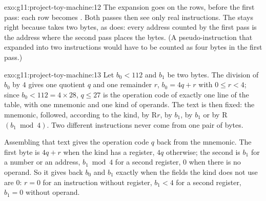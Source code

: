 \begin{solution}{exo:g11:project-toy-machine:12}
The expansion goes on the rows, before the first pass: each row  becomes . Both passes
then see only real instructions. The  stays right because  takes two bytes, as  does:
every address counted by the first pass is the address where the second pass places the bytes. (A pseudo-instruction
that expanded into two instructions would have to be counted as four bytes in the first pass.)

\smallskip\noindent\hspace*{2em}

\noindent\hspace*{4em}

\noindent\hspace*{4em}

\noindent\hspace*{6em}

\noindent\hspace*{8em}

\noindent\hspace*{6em}

\noindent\hspace*{4em}
\end{solution}

\begin{solution}{exo:g11:project-toy-machine:13}
Let $b_0 < 112$ and $b_1$ be two bytes. The division of $b_0$ by $4$ gives one quotient $q$ and one remainder $r$,
$b_0 = 4q + r$ with $0 \le r < 4$; since $b_0 < 112 = 4 \times 28$, $q \le 27$ is the operation code of exactly one
line of the table, with one mnemonic and one kind of operands. The text is then fixed: the mnemonic, followed,
according to the kind, by R$r$, by $b_1$, by \code{[}$b_1$\code{]} or by R$(b_1 \bmod 4)$. Two different
instructions never come from one pair of bytes.

Assembling that text gives the operation code $q$ back from the mnemonic. The first byte is $4q + r$ when the kind
has a register, $4q$ otherwise; the second is $b_1$ for a number or an address, $b_1 \bmod 4$ for a second register,
$0$ when there is no operand. So it gives back $b_0$ and $b_1$ exactly when the fields the kind does not use are $0$:
$r = 0$ for an instruction without register, $b_1 < 4$ for a second register, $b_1 = 0$ without operand.
\end{solution}

